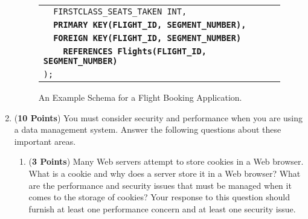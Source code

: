 \documentclass[12pt]{article}
\begin{document}
\begin{enumerate}
\begin{figure}[hp]
\begin{tabular}{l}
                  \texttt{~~FIRSTCLASS\_SEATS\_TAKEN~INT,}                              \\
                  \texttt{~~\textbf{PRIMARY KEY(FLIGHT\_ID, SEGMENT\_NUMBER),}}         \\
                  \texttt{~~\textbf{FOREIGN KEY(FLIGHT\_ID, SEGMENT\_NUMBER)}}          \\
                  \texttt{~~~~\textbf{REFERENCES Flights(FLIGHT\_ID, SEGMENT\_NUMBER)}} \\
                  \texttt{);}                                                           \\
                \end{tabular}
                \caption{\label{fig:motivating-example}An Example Schema for a Flight Booking Application.}
                \vspace{-2em}
              \end{figure}

              \newpage

            \item ({\bf 10 Points}) You must consider security and performance when you are using a data management
              system.  Answer the following questions about these important areas.

              \begin{enumerate}



                  \item ({\bf 3 Points}) Many Web servers attempt to store cookies in a Web browser.  What is a cookie
                    and why does a server store it in a Web browser?  What are the performance and security issues that
                    must be managed when it comes to the storage of cookies?  Your response to this question should
                    furnish at least one performance concern and at least one security issue.


\end{enumerate}
\end{enumerate}
\end{document}
